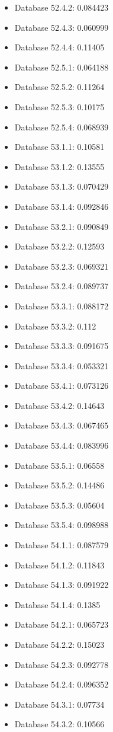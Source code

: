 \begin{itemize}
\item Database 52.4.2: 0.084423
\item Database 52.4.3: 0.060999
\item Database 52.4.4: 0.11405
\item Database 52.5.1: 0.064188
\item Database 52.5.2: 0.11264
\item Database 52.5.3: 0.10175
\item Database 52.5.4: 0.068939
\item Database 53.1.1: 0.10581
\item Database 53.1.2: 0.13555
\item Database 53.1.3: 0.070429
\item Database 53.1.4: 0.092846
\item Database 53.2.1: 0.090849
\item Database 53.2.2: 0.12593
\item Database 53.2.3: 0.069321
\item Database 53.2.4: 0.089737
\item Database 53.3.1: 0.088172
\item Database 53.3.2: 0.112
\item Database 53.3.3: 0.091675
\item Database 53.3.4: 0.053321
\item Database 53.4.1: 0.073126
\item Database 53.4.2: 0.14643
\item Database 53.4.3: 0.067465
\item Database 53.4.4: 0.083996
\item Database 53.5.1: 0.06558
\item Database 53.5.2: 0.14486
\item Database 53.5.3: 0.05604
\item Database 53.5.4: 0.098988
\item Database 54.1.1: 0.087579
\item Database 54.1.2: 0.11843
\item Database 54.1.3: 0.091922
\item Database 54.1.4: 0.1385
\item Database 54.2.1: 0.065723
\item Database 54.2.2: 0.15023
\item Database 54.2.3: 0.092778
\item Database 54.2.4: 0.096352
\item Database 54.3.1: 0.07734
\item Database 54.3.2: 0.10566

\end{itemize}
